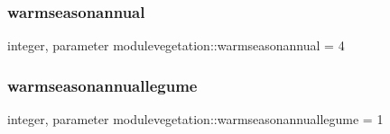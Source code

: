 \subsubsection{\texorpdfstring{warmseasonannual}{warmseasonannual}}
{\footnotesize\ttfamily integer, parameter modulevegetation\+::warmseasonannual = 4\hspace{0.3cm}{\ttfamily [private]}}

\mbox{\label{namespacemodulevegetation_ac51d5cc86df047d333a5cdc12fa3aac9}} 
\subsubsection{\texorpdfstring{warmseasonannuallegume}{warmseasonannuallegume}}
{\footnotesize\ttfamily integer, parameter modulevegetation\+::warmseasonannuallegume = 1\hspace{0.3cm}{\ttfamily [private]}}

